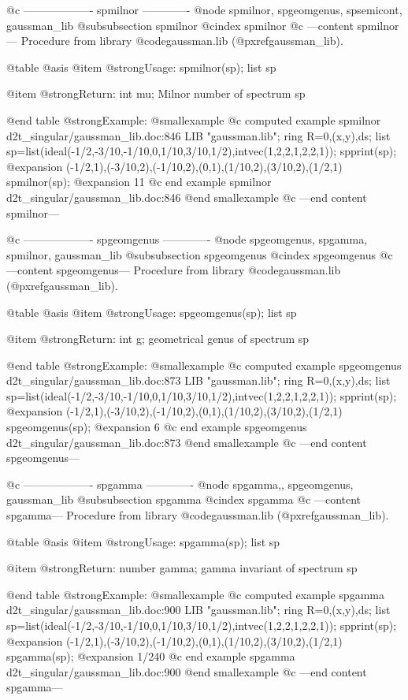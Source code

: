 @c ------------------- spmilnor -------------
@node spmilnor, spgeomgenus, spsemicont, gaussman_lib
@subsubsection spmilnor
@cindex spmilnor
@c ---content spmilnor---
Procedure from library @code{gaussman.lib} (@pxref{gaussman_lib}).

@table @asis
@item @strong{Usage:}
spmilnor(sp); list sp

@item @strong{Return:}
int mu; Milnor number of spectrum sp

@end table
@strong{Example:}
@smallexample
@c computed example spmilnor d2t_singular/gaussman_lib.doc:846 
LIB "gaussman.lib";
ring R=0,(x,y),ds;
list sp=list(ideal(-1/2,-3/10,-1/10,0,1/10,3/10,1/2),intvec(1,2,2,1,2,2,1));
spprint(sp);
@expansion{} (-1/2,1),(-3/10,2),(-1/10,2),(0,1),(1/10,2),(3/10,2),(1/2,1)
spmilnor(sp);
@expansion{} 11
@c end example spmilnor d2t_singular/gaussman_lib.doc:846
@end smallexample
@c ---end content spmilnor---

@c ------------------- spgeomgenus -------------
@node spgeomgenus, spgamma, spmilnor, gaussman_lib
@subsubsection spgeomgenus
@cindex spgeomgenus
@c ---content spgeomgenus---
Procedure from library @code{gaussman.lib} (@pxref{gaussman_lib}).

@table @asis
@item @strong{Usage:}
spgeomgenus(sp); list sp

@item @strong{Return:}
int g; geometrical genus of spectrum sp

@end table
@strong{Example:}
@smallexample
@c computed example spgeomgenus d2t_singular/gaussman_lib.doc:873 
LIB "gaussman.lib";
ring R=0,(x,y),ds;
list sp=list(ideal(-1/2,-3/10,-1/10,0,1/10,3/10,1/2),intvec(1,2,2,1,2,2,1));
spprint(sp);
@expansion{} (-1/2,1),(-3/10,2),(-1/10,2),(0,1),(1/10,2),(3/10,2),(1/2,1)
spgeomgenus(sp);
@expansion{} 6
@c end example spgeomgenus d2t_singular/gaussman_lib.doc:873
@end smallexample
@c ---end content spgeomgenus---

@c ------------------- spgamma -------------
@node spgamma,, spgeomgenus, gaussman_lib
@subsubsection spgamma
@cindex spgamma
@c ---content spgamma---
Procedure from library @code{gaussman.lib} (@pxref{gaussman_lib}).

@table @asis
@item @strong{Usage:}
spgamma(sp); list sp

@item @strong{Return:}
number gamma; gamma invariant of spectrum sp

@end table
@strong{Example:}
@smallexample
@c computed example spgamma d2t_singular/gaussman_lib.doc:900 
LIB "gaussman.lib";
ring R=0,(x,y),ds;
list sp=list(ideal(-1/2,-3/10,-1/10,0,1/10,3/10,1/2),intvec(1,2,2,1,2,2,1));
spprint(sp);
@expansion{} (-1/2,1),(-3/10,2),(-1/10,2),(0,1),(1/10,2),(3/10,2),(1/2,1)
spgamma(sp);
@expansion{} 1/240
@c end example spgamma d2t_singular/gaussman_lib.doc:900
@end smallexample
@c ---end content spgamma---
